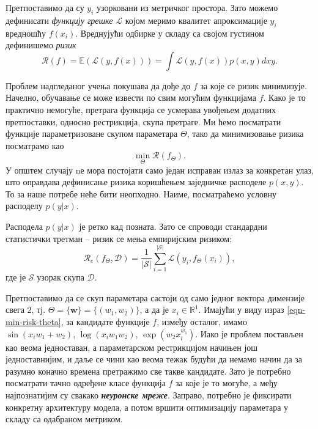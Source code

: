 \documentclass[12pt, a4paper, twoside]{book}
\numberwithin{equation}{chapter}
\numberwithin{theorem}{section}
\numberwithin{definition}{section}
\numberwithin{definitionChapter}{chapter}
\begin{document}
Претпоставимо да су $y_i$ узорковани из метричког простора. Зато можемо дефинисати
\textit{функцију грешке} $\mathcal{L}$ којом меримо квалитет апроксимације $y_i$
вредношћу $f(x_i)$. Вреднујући одбирке у складу са својом густином дефинишемо \textit{ризик}
\begin{equation}
	\mathcal{R}(f) = \mathbb{E}(\mathcal{L}(y, f(x)))=\int\mathcal{L}(y, f(x))p(x, y)dxy.
	\label{eqn-risk}
\end{equation}

Проблем надгледаног учења покушава да дође до $f$ за које се ризик минимизује. Начелно,
обучавање се може извести по свим могућим функцијама $f$. Како је то практично немогуће,
претрага функција се усмерава увођењем додатних претпоставки, односно рестрикција, скупа
претраге. Ми ћемо посматрати функције параметризоване скупом параметара $\Theta$,
тако да минимизовање ризика посматрамо као
\begin{equation}
	\min_{\Theta}\mathcal{R}(f_{\Theta}).
	\label{eqn-min-risk-theta}
\end{equation}
У општем случају nе мора постојати само један исправан излаз за конкретан улаз, што оправдава
дефинисање ризика коришћењем заједничке расподеле $p(x, y)$. То за наше потребе неће бити
неопходно. Наиме, посматраћемо условну расподелу $p(y\vert x)$.

Расподела $p(y\vert x)$ је ретко кад позната. Зато се спроводи стандардни статистички
третман -- ризик се мења емпиријским ризиком:
\begin{equation}
	\mathcal{R}_e(f_\Theta, \mathcal{D}) = \frac{1}{\vert \mathcal{S}\vert}\sum_{i=1}^{\vert \mathcal{S}\vert}\mathcal{L}(y_i, f_\Theta(x_i)),
\end{equation}
где је $\mathcal{S}$ узорак скупа $\mathcal{D}$.

Претпоставимо да се скуп параметара састоји од само једног вектора димензије свега $2$,
тј. $\Theta = \{\mathbf{w}\} = \{(w_1, w_2)\}$,
а да је $x_i \in \mathbb{R}^{1}$. Имајући у виду израз \ref{eqn-min-risk-theta}, за кандидате
функције $f$, између осталог, имамо $\sin(x_i w_1 + w_2)$, $\log(x_i w_1 w_2)$,
$\exp(w_2x_i^{w_1})$. Иако је проблем постављен као веома једноставан, а параметарском
рестрикцијом начињен још једноставнијим, и даље се чини као веома тежак будући да немамо
начин да за разумно коначно времена претражимо све такве кандидате. Зато је потребно посматрати
тачно одређене класе функција $f$ за које је то могуће, а међу најпознатијим су свакако
\textbf{\textit{неуронске мреже}}. Заправо, потребно је фиксирати конкретну архитектуру модела, а
потом вршити оптимизацију параметара у складу са одабраном метриком.
\end{document}
